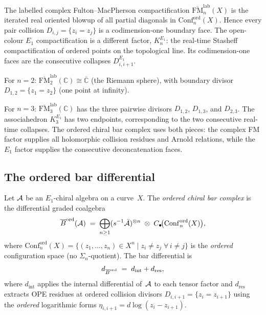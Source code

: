 \begin{construction}
\label{constr:ordered-fm}
The labelled complex Fulton--MacPherson compactification
$\overline{\mathrm{FM}}_n^{\mathrm{lab}}(X)$ is the iterated real
oriented blowup of all partial diagonals in
$\mathrm{Conf}_n^{\mathrm{ord}}(X)$. Hence every pair collision
$D_{i,j}=\{z_i=z_j\}$ is a codimension-one boundary face. The
open-colour $E_1$ compactification is a different factor,
$K_n^{E_1}$: the real-time Stasheff compactification of ordered
points on the topological line. Its codimension-one faces are the
consecutive collapses $D^{E_1}_{i,i+1}$.

For $n=2$:
$\overline{\mathrm{FM}}_2^{\mathrm{lab}}(\mathbb C)
\cong\overline{\mathbb C}$ (the Riemann sphere), with
boundary divisor $D_{1,2}=\{z_1=z_2\}$ (one point at
infinity).

For $n=3$:
$\overline{\mathrm{FM}}_3^{\mathrm{lab}}(\mathbb C)$ has the three
pairwise divisors $D_{1,2}$, $D_{1,3}$, and $D_{2,3}$. The
associahedron $K_3^{E_1}$ has two endpoints, corresponding to the
two consecutive real-time collapses. The ordered chiral bar complex
uses both pieces: the complex FM factor supplies all holomorphic
collision residues and Arnold relations, while the $E_1$ factor
supplies the consecutive deconcatenation faces.
\end{construction}

\subsection{The ordered bar differential}
\label{subsec:ordered-bar-definition}

\begin{definition}
\label{def:ordered-chiral-bar}
Let $\mathcal{A}$ be an $E_1$-chiral algebra on a curve~$X$. The
\emph{ordered chiral bar complex} is the differential graded
coalgebra
\[
\overline{B}^{\mathrm{ord}}(\mathcal{A})
\;=\;
\bigoplus_{n\ge 1}
(s^{-1}\bar{\mathcal{A}})^{\otimes n}
\;\otimes\;
C_\bullet\!\bigl(\mathrm{Conf}_n^{\mathrm{ord}}(X)\bigr),
\]
where $\mathrm{Conf}_n^{\mathrm{ord}}(X)
=\{(z_1,\dots,z_n)\in X^n\mid z_i\neq z_j\;\forall\,i\neq j\}$
is the \emph{ordered} configuration space (no $\Sigma_n$-quotient).
The bar differential is
\[
d_{\overline{B}^{\mathrm{ord}}}
\;=\;
d_{\mathrm{int}}+d_{\mathrm{res}},
\]
where $d_{\mathrm{int}}$ applies the internal differential
of~$\mathcal{A}$ to each tensor factor and $d_{\mathrm{res}}$
extracts OPE residues at ordered collision divisors
$D_{i,i+1}=\{z_i=z_{i+1}\}$ using the \emph{ordered}
logarithmic forms $\eta_{i,i+1}=d\log(z_i-z_{i+1})$.

\end{definition}

